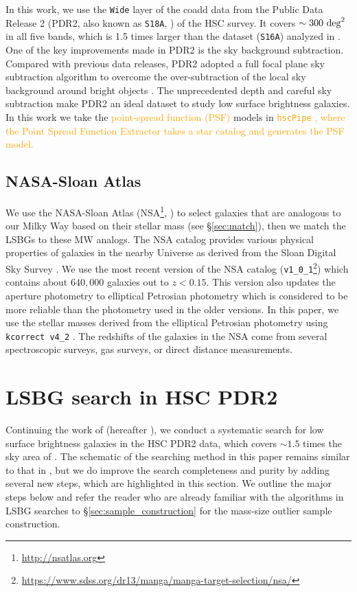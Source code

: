 \documentclass[twocolumn,astrosymb,twocolappendix,linenumbers]{aastex631}
\newcommand{\emphasize}{\textcolor{orange}}
\newcommand{\code}[1]{\texttt{#1}}
\begin{document}
\begin{CJK*}{UTF8}{gbsn}
In this work, we use the \code{Wide} layer of the coadd data from the Public Data Release 2 (PDR2, also known as \code{S18A}, \citealt{Aihara2018}) of the HSC survey. It covers $\sim 300\ \rm{deg}^2$ in all five bands, which is 1.5 times larger than the dataset (\code{S16A}) analyzed in \citet{Greco2018}. One of the key improvements made in PDR2 is the sky background subtraction. Compared with previous data releases, PDR2 adopted a full focal plane sky subtraction algorithm to overcome the over-subtraction of the local sky background around bright objects \citep{Aihara2018,Li2021}. The unprecedented depth and careful sky subtraction make PDR2 an ideal dataset to study low surface brightness galaxies. In this work we take the \emphasize{point-spread function (PSF)} models in \emphasize{\code{hscPipe} \citep{Bosch2018}, where the Point Spread Function Extractor \citep[\texttt{PSFEx},][]{Bertin2011} takes a star catalog and generates the PSF model.}


\subsection{NASA-Sloan Atlas}
We use the NASA-Sloan Atlas (NSA\footnote{\url{http://nsatlas.org}}, \citealt{Blanton2005,Blanton2011}) to select galaxies that are analogous to our Milky Way based on their stellar mass (see \S\ref{sec:match}), then we match the LSBGs to these MW analogs. The NSA catalog provides various physical properties of galaxies in the nearby Universe as derived from the Sloan Digital Sky Survey \citep[SDSS,][]{York2000}. We use the most recent version of the NSA catalog (\code{v1\_0\_1}\footnote{\url{https://www.sdss.org/dr13/manga/manga-target-selection/nsa/}}) which contains about $640,000$ galaxies out to $z < 0.15$. This version also updates the aperture photometry to elliptical Petrosian photometry which is considered to be more reliable than the photometry used in the older versions. In this paper, we use the stellar masses derived from the elliptical Petrosian photometry using \code{kcorrect v4\_2} \citep{Blanton2007}. The redshifts of the galaxies in the NSA come from several spectroscopic surveys,  gas surveys, or direct distance measurements. 

\section{LSBG search in HSC PDR2}\label{sec:lsbg_search}

Continuing the work of \citet{Greco2018} (hereafter ), we conduct a systematic search for low surface brightness galaxies in the HSC PDR2 data, which covers $\sim 1.5$ times the sky area of . The schematic of the searching method in this paper remains similar to that in , but we do improve the search completeness and purity by adding several new steps, which are highlighted in this section. We outline the major steps below and refer the reader who are already familiar with the algorithms in LSBG searches to \S \ref{sec:sample_construction} for the mass-size outlier sample construction.


\end{CJK*}
\end{document}
